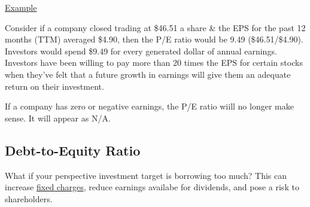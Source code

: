 \documentclass{article}
\begin{document}
	\underline{Example} \newline

	Consider if a company closed trading at \$46.51 a share \& the EPS for the past 12 months (TTM) averaged \$4.90, then the P/E ratio would be 9.49 (\$46.51/\$4.90). Investors would spend \$9.49 for
	every generated dollar of annual earnings. Investors have been willing to pay more than 20 times the EPS for certain stocks when they've felt that a future growth in earnings will give them an
	adequate return on their investment. \newline

	If a company has zero or negative earnings, the P/E ratio wiill no longer make sense. It will appear as N/A.

	\subsection{Debt-to-Equity Ratio}

	What if your perspective investment target is borrowing too much? This can increase \href{https://www.investopedia.com/terms/f/fixed-charge.asp}{fixed charges}, reduce earnings availabe for
	dividends, and pose a risk to shareholders. \newline
\end{document}
